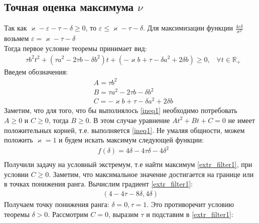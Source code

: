 \documentclass[a4paper,14pt]{extarticle} %
\begin{document}
\subsection{Точная оценка максимума $\nu$}
Так как $\varkappa - \varepsilon - \tau - \delta \geq 0$, то $ \varepsilon \leq \varkappa - \tau - \delta$. Для максимизации функции $\frac{4\varepsilon\delta}{\varkappa^2}$ возьмем $\varepsilon = \varkappa - \tau - \delta$\\
Тогда первое условие теоремы принимает вид:
\begin{equation}\label{ineq1} 
 \begin{aligned}
&\tau b^2t^2 + (\tau a^2-2 \tau b - \delta b^2)t + (-\varkappa b+\tau-\delta a^2 + 2\delta b) \geq 0 \text{,}\quad \forall t \in \mathbb{R_+}
 \end{aligned}
\end{equation}
Введем обозначения:
\begin{equation}
 \begin{aligned}
&A = \tau b^2\\
&B = \tau a^2-2 \tau b - \delta b^2\\
&C = -\varkappa b+\tau-\delta a^2 + 2\delta b
 \end{aligned}
\end{equation}
Заметим, что для того, что бы выполнялось \eqref{ineq1} необходимо потребовать $A \geq 0$ и $C \geq 0$, тогда $B \geq 0$. В этом случае уравнение $At^2 + Bt + C = 0$ не имеет положительных корней, т.е. выполняется \eqref{ineq1}. Не умаляя общности, можем положить $\varkappa = 1$ и будем искать максимум следующей функции: 
\begin{equation}\label{extr_filter1}
 \begin{aligned}
&f(\delta) = 4\delta-4\tau\delta - 4\delta^2\\
 \end{aligned}
\end{equation} 
Получили задачу на условный экстремум, т.е найти максимум \eqref{extr_filter1}, при условии $C \geq 0$.  Заметим, что максимальное значение достигается на границе или в точках понижения ранга. Вычислим градиент \eqref{extr_filter1}:
\begin{equation}
 \begin{aligned}
(4 - 4\tau - 8\delta, 4\delta)
 \end{aligned}
\end{equation} 
Получаем точку понижения ранга: $\delta = 0, \tau = 1$. Это противоречит условию теоремы $\delta > 0$. Рассмотрим $C = 0$, выразим $\tau$ и подставим в \eqref{extr_filter1}:
\end{document}
